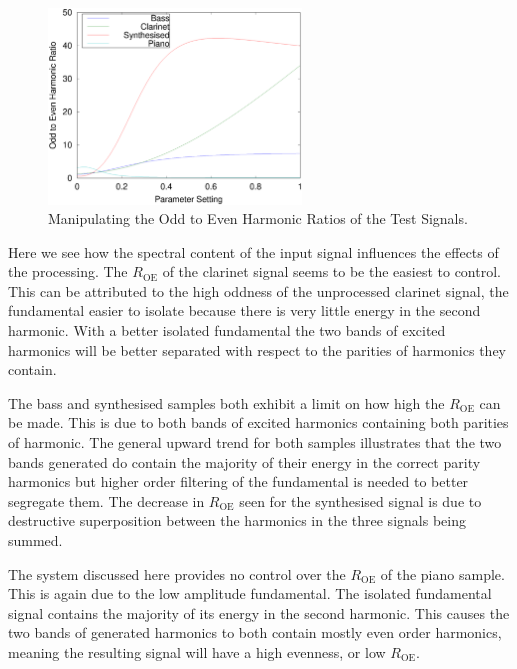 			\begin{figure}[h!]
				\centering
				\includegraphics[width=0.6\textwidth]{chapter6/Images/MoveParities.eps}
				\caption{Manipulating the Odd to Even Harmonic Ratios of the Test Signals.}
				\label{fig:MoveParities}
			\end{figure}

			Here we see how the spectral content of the input signal influences the effects of the processing.
			The $R_{\textrm{OE}}$ of the clarinet signal seems to be the easiest to control. This can be
			attributed to the high oddness of the unprocessed clarinet signal, the fundamental easier to
			isolate because there is very little energy in the second harmonic. With a better isolated
			fundamental the two bands of excited harmonics will be better separated with respect to the
			parities of harmonics they contain.

			The bass and synthesised samples both exhibit a limit on how high the $R_{\textrm{OE}}$ can be
			made. This is due to both bands of excited harmonics containing both parities of harmonic.  The
			general upward trend for both samples illustrates that the two bands generated do contain the
			majority of their energy in the correct parity harmonics but higher order filtering of the
			fundamental is needed to better segregate them. The decrease in $R_{\textrm{OE}}$ seen for the
			synthesised signal is due to destructive superposition between the harmonics in the three signals
			being summed.

			The system discussed here provides no control over the $R_{\textrm{OE}}$ of the piano sample. This
			is again due to the low amplitude fundamental. The isolated fundamental signal contains the
			majority of its energy in the second harmonic. This causes the two bands of generated harmonics to
			both contain mostly even order harmonics, meaning the resulting signal will have a high evenness,
			or low $R_{\textrm{OE}}$.


